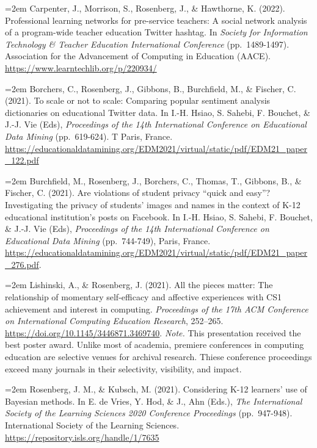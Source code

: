 \documentclass[
  14,
]{article}
\begin{document}
\hangindent=2em Carpenter, J., Morrison, S., Rosenberg, J., \&
Hawthorne, K. (2022). Professional learning networks for pre-service
teachers: A social network analysis of a program-wide teacher education
Twitter hashtag. In \emph{Society for Information Technology \& Teacher
Education International Conference} (pp.~1489-1497). Association for the
Advancement of Computing in Education (AACE).
\url{https://www.learntechlib.org/p/220934/}

\hangindent=2em Borchers, C., Rosenberg, J., Gibbons, B., Burchfield,
M., \& Fischer, C. (2021). To scale or not to scale: Comparing popular
sentiment analysis dictionaries on educational Twitter data. In I.-H.
Hsiao, S. Sahebi, F. Bouchet, \& J.-J. Vie (Eds), \emph{Proceedings of
the 14th International Conference on Educational Data Mining}
(pp.~619-624). T Paris, France.
\url{https://educationaldatamining.org/EDM2021/virtual/static/pdf/EDM21_paper_122.pdf}

\hangindent=2em Burchfield, M., Rosenberg, J., Borchers, C., Thomas, T.,
Gibbons, B., \& Fischer, C. (2021). Are violations of student privacy
``quick and easy''? Investigating the privacy of students' images and
names in the context of K-12 educational institution's posts on
Facebook. In I.-H. Hsiao, S. Sahebi, F. Bouchet, \& J.-J. Vie (Eds),
\emph{Proceedings of the 14th International Conference on Educational
Data Mining} (pp.~744-749), Paris, France.
\url{https://educationaldatamining.org/EDM2021/virtual/static/pdf/EDM21_paper_276.pdf}.

\hangindent=2em Lishinski, A., \& Rosenberg, J. (2021). All the pieces
matter: The relationship of momentary self-efficacy and affective
experiences with CS1 achievement and interest in computing.
\emph{Proceedings of the 17th ACM Conference on International Computing
Education Research}, 252--265.
\url{https://doi.org/10.1145/3446871.3469740}. \emph{Note.} This
presentation received the best poster award. Unlike most of academia,
premiere conferences in computing education are selective venues for
archival research. Thiese conference proceedings exceed many journals in
their selectivity, visibility, and impact.

\hangindent=2em Rosenberg, J. M., \& Kubsch, M. (2021). Considering K-12
learners' use of Bayesian methods. In E. de Vries, Y. Hod, \& J., Ahn
(Eds.), \emph{The International Society of the Learning Sciences 2020
Conference Proceedings} (pp.~947-948). International Society of the
Learning Sciences. \url{https://repository.isls.org/handle/1/7635}
\end{document}

